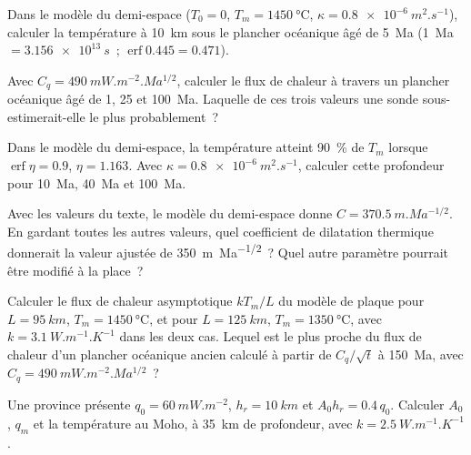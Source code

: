 \begin{exercise}[$\star$]\label{exo:b3:lithosphere-thermal-models:3}
Dans le modèle du demi-espace ($T_0 = 0$, $T_m = \qty{1450}{\celsius}$, $\kappa =
\qty{0.8e-6}{m^2.s^{-1}}$), calculer la température à \qty{10}{km} sous le plancher
océanique âgé de \qty{5}{Ma} (\qty{1}{Ma} $= \qty{3.156e13}{s}$~; $\operatorname{erf}
0.445 = 0.471$).
\end{exercise}

\begin{exercise}[$\star$]\label{exo:b3:lithosphere-thermal-models:4}
Avec $C_q = \qty{490}{mW.m^{-2}.Ma^{1/2}}$, calculer le flux de chaleur à travers
un plancher océanique âgé de 1, 25 et \qty{100}{Ma}. Laquelle de ces trois valeurs
une sonde sous-estimerait-elle le plus probablement~?
\end{exercise}

\begin{exercise}[$\star\star$]\label{exo:b3:lithosphere-thermal-models:5}
Dans le modèle du demi-espace, la température atteint \qty{90}{\percent} de $T_m$
lorsque $\operatorname{erf}\eta = 0.9$, $\eta = 1.163$. Avec $\kappa =
\qty{0.8e-6}{m^2.s^{-1}}$, calculer cette profondeur pour \qty{10}{Ma}, \qty{40}{Ma} et \qty{100}{Ma}.
\end{exercise}

\begin{exercise}[$\star\star$]\label{exo:b3:lithosphere-thermal-models:6}
Avec les valeurs du texte, le modèle du demi-espace donne $C =
\qty{370.5}{m.Ma^{-1/2}}$. En gardant toutes les autres valeurs, quel coefficient de
dilatation thermique donnerait la valeur ajustée de \qty{350}{m.Ma^{-1/2}}~? Quel autre
paramètre pourrait être modifié à la place~?
\end{exercise}

\begin{exercise}[$\star\star$]\label{exo:b3:lithosphere-thermal-models:7}
Calculer le flux de chaleur asymptotique $kT_m/L$ du modèle de plaque pour $L =
\qty{95}{km}$, $T_m = \qty{1450}{\celsius}$, et pour $L = \qty{125}{km}$,
$T_m = \qty{1350}{\celsius}$, avec $k = \qty{3.1}{W.m^{-1}.K^{-1}}$ dans les deux cas.
Lequel est le plus proche du flux de chaleur d'un plancher océanique ancien calculé à partir de $C_q/\sqrt t$
à \qty{150}{Ma}, avec $C_q = \qty{490}{mW.m^{-2}.Ma^{1/2}}$~?
\end{exercise}

\begin{exercise}[$\star\star$]\label{exo:b3:lithosphere-thermal-models:8}
Une province présente $q_0 = \qty{60}{mW.m^{-2}}$, $h_r = \qty{10}{km}$ et $A_0h_r =
0.4\,q_0$. Calculer $A_0$, $q_m$ et la température au Moho, à \qty{35}{km}
de profondeur, avec $k = \qty{2.5}{W.m^{-1}.K^{-1}}$.
\end{exercise}

